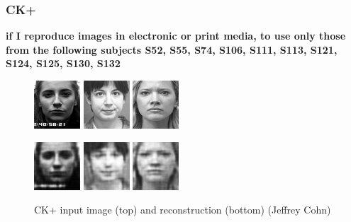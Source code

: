 \documentclass{article}
\begin{document}
    \subsubsection{CK+}
    \textbf{if I reproduce images in electronic or print media, to use only those from the following subjects 
S52, S55, S74, S106, S111, S113, S121, S124, S125, S130, S132} \\
      \begin{figure}[h]
        \centering
        \includegraphics[width=0.2\linewidth]{../graphics/reconstructions/ckplus/input_00.png}
        \includegraphics[width=0.2\linewidth]{../graphics/reconstructions/ckplus/input_01.png}
        \includegraphics[width=0.2\linewidth]{../graphics/reconstructions/ckplus/input_02.png}

        \includegraphics[width=0.2\linewidth]{../graphics/reconstructions/ckplus/reconstruction_00.png}
        \includegraphics[width=0.2\linewidth]{../graphics/reconstructions/ckplus/reconstruction_01.png}
        \includegraphics[width=0.2\linewidth]{../graphics/reconstructions/ckplus/reconstruction_02.png}

        \caption{CK+ input image (top) and reconstruction (bottom) ({\textcopyright}Jeffrey Cohn)}
      \end{figure}
\end{document}
